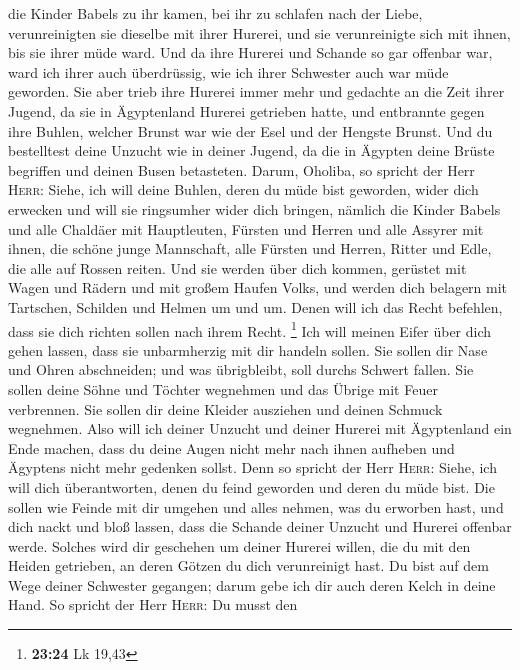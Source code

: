 die Kinder Babels zu ihr kamen, bei ihr zu schlafen nach der Liebe,
verunreinigten sie dieselbe mit ihrer Hurerei, und sie verunreinigte
sich mit ihnen, bis sie ihrer müde ward.  Und da ihre
Hurerei und Schande so gar offenbar war, ward ich ihrer auch
überdrüssig, wie ich ihrer Schwester auch war müde geworden.
 Sie aber trieb ihre Hurerei immer mehr und gedachte an
die Zeit ihrer Jugend, da sie in Ägyptenland Hurerei getrieben hatte,
 und entbrannte gegen ihre Buhlen, welcher Brunst war wie
der Esel und der Hengste Brunst.  Und du bestelltest
deine Unzucht wie in deiner Jugend, da die in Ägypten deine Brüste
begriffen und deinen Busen betasteten.  Darum, Oholiba,
so spricht der Herr \textsc{Herr}: Siehe, ich will deine Buhlen, deren
du müde bist geworden, wider dich erwecken und will sie ringsumher wider
dich bringen,  nämlich die Kinder Babels und alle
Chaldäer mit Hauptleuten, Fürsten und Herren und alle Assyrer mit ihnen,
die schöne junge Mannschaft, alle Fürsten und Herren, Ritter und Edle,
die alle auf Rossen reiten.  Und sie werden über dich
kommen, gerüstet mit Wagen und Rädern und mit großem Haufen Volks, und
werden dich belagern mit Tartschen, Schilden und Helmen um und um. Denen
will ich das Recht befehlen, dass sie dich richten sollen nach ihrem
Recht. \footnote{\textbf{23:24} Lk 19,43}  Ich will
meinen Eifer über dich gehen lassen, dass sie unbarmherzig mit dir
handeln sollen. Sie sollen dir Nase und Ohren abschneiden; und was
übrigbleibt, soll durchs Schwert fallen. Sie sollen deine Söhne und
Töchter wegnehmen und das Übrige mit Feuer verbrennen. 
Sie sollen dir deine Kleider ausziehen und deinen Schmuck wegnehmen.
 Also will ich deiner Unzucht und deiner Hurerei mit
Ägyptenland ein Ende machen, dass du deine Augen nicht mehr nach ihnen
aufheben und Ägyptens nicht mehr gedenken sollst.  Denn
so spricht der Herr \textsc{Herr}: Siehe, ich will dich überantworten,
denen du feind geworden und deren du müde bist.  Die
sollen wie Feinde mit dir umgehen und alles nehmen, was du erworben
hast, und dich nackt und bloß lassen, dass die Schande deiner Unzucht
und Hurerei offenbar werde.  Solches wird dir geschehen
um deiner Hurerei willen, die du mit den Heiden getrieben, an deren
Götzen du dich verunreinigt hast.  Du bist auf dem Wege
deiner Schwester gegangen; darum gebe ich dir auch deren Kelch in deine
Hand.  So spricht der Herr \textsc{Herr}: Du musst den
